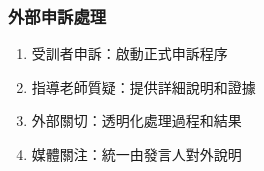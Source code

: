 \documentclass[12pt,a4paper]{article}
\begin{document}
\subsubsection{外部申訴處理}
\begin{enumerate}
    \item 受訓者申訴：啟動正式申訴程序
    \item 指導老師質疑：提供詳細說明和證據
    \item 外部關切：透明化處理過程和結果
    \item 媒體關注：統一由發言人對外說明
\end{enumerate}
\end{document}
